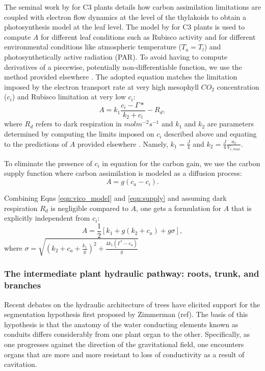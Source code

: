 \documentclass[utf8]{frontiersSCNS} %
\begin{document}
The seminal work by \citet{Farquhar1980} for C3 plants details how carbon assimilation limitations are coupled with electron flow dynamics at the level of the thylakoids to obtain a photosynthesis model at the leaf level.
The model by \citet{Farquhar1980} for C3 plants is used to compute $A$ for different leaf conditions such as Rubisco activity and for different environmental conditions like atmospheric temperature ($T_a = T_l$) and photosynthetically active radiation (PAR). To avoid having to compute derivatives of a piecewise, potentially non-differentiable function, we use the method provided elsewhere \citep{Vico2013}. The adopted equation matches the limitation imposed by the electron transport rate at very high mesophyll $CO_2$ concentration ($c_i$) and Rubisco limitation at very low $c_i$:
\begin{equation}
    \label{eqn:vico_model}
    A = k_1 \frac{c_i - \Gamma*}{k_2 + c_i} - R_d,
\end{equation}
where $R_d$ refers to dark respiration in $mol m^{-2} s^{-1}$ and $k_1$ and $k_2$ are parameters determined by computing the limits imposed on $c_i$ described above and equating to the predictions of $A$ provided elsewhere \citep{Farquhar1980}. Namely, $k_1 = \frac{J}{4}$ and $k_2 = \frac{J}{4} \frac{a_2}{V_{c,max}}$.

To eliminate the presence of $c_i$ in equation for the carbon gain, we use the carbon supply function where carbon assimilation is modeled as a diffusion process:
\begin{equation}
    \label{eqn:supply}
    A = g(c_a - c_i).
\end{equation}

Combining Eqns \ref{eqn:vico_model} and \ref{eqn:supply} and assuming dark respiration $R_d$ is negligible compared to $A$, one gets a formulation for $A$ that is explicitly independent from $c_i$:
\begin{equation}
    \label{eqn:A_noci}
    A = \frac{1}{2}[k_1 + g(k_2 + c_a) + g \sigma],
\end{equation}
where $\sigma = \sqrt{(k_2 + c_a + \frac{k_1}{g})^2 + \frac{4k_1(\Gamma^*-c_a)}{g}}$

\subsubsection{The intermediate plant hydraulic pathway: roots, trunk, and branches}

Recent debates on the hydraulic architecture of trees have elicited support for the segmentation hypothesis first proposed by Zimmerman (ref). The basis of this hypothesis is that the anatomy of the water conducting elements known as conduits differs considerably from one plant organ to the other. Specifically, as one progresses against the direction of the gravitational field, one encounters organs that are more and more resistant to loss of conductivity as a result of cavitation. 
\end{document}
